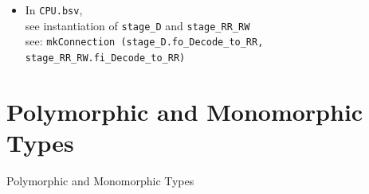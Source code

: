 \begin{frame}[fragile]
{\begin{minipage}{0.75\textwidth}
\begin{itemize}
  \item In {\tt CPU.bsv}, \\
        \hm see instantiation of {\tt stage\_D} and {\tt stage\_RR\_RW} \\
        \hm see: {\tt mkConnection (stage\_D.fo\_Decode\_to\_RR, stage\_RR\_RW.fi\_Decode\_to\_RR)}

 \end{itemize}
\end{minipage}}

\end{frame}


\section{Polymorphic and Monomorphic Types}


\begin{frame}

\begin{center}
  {\LARGE Polymorphic and Monomorphic Types}
\end{center}

\end{frame}


